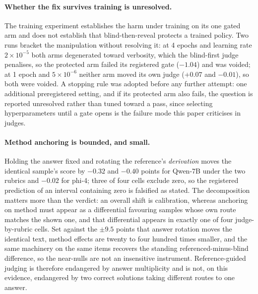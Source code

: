 \documentclass[11pt]{article}
\begin{document}
\paragraph{Whether the fix survives training is unresolved.}
The training experiment establishes the harm under training on its one gated arm and does not establish that blind-then-reveal protects a trained policy.
Two runs bracket the manipulation without resolving it: at 4 epochs and learning rate $2\times10^{-5}$ both arms degenerated toward verbosity, which the blind-first judge penalises, so the protected arm failed its registered gate ($-1.04$) and was voided; at 1 epoch and $5\times10^{-6}$ neither arm moved its own judge ($+0.07$ and $-0.01$), so both were voided.
A stopping rule was adopted before any further attempt: one additional preregistered setting, and if its protected arm also fails, the question is reported unresolved rather than tuned toward a pass, since selecting hyperparameters until a gate opens is the failure mode this paper criticises in judges.

\paragraph{Method anchoring is bounded, and small.}
Holding the answer fixed and rotating the reference's \emph{derivation} moves the identical sample's score by $-0.32$ and $-0.40$ points for Qwen-7B under the two rubrics and $-0.02$ for phi-4; three of four cells exclude zero, so the registered prediction of an interval containing zero is falsified as stated.
The decomposition matters more than the verdict: an overall shift is calibration, whereas anchoring on method must appear as a differential favouring samples whose own route matches the shown one, and that differential appears in exactly one of four judge-by-rubric cells.
Set against the $\pm 9.5$ points that answer rotation moves the identical text, method effects are twenty to four hundred times smaller, and the same machinery on the same items recovers the standing referenced-minus-blind difference, so the near-nulls are not an insensitive instrument.
Reference-guided judging is therefore endangered by answer multiplicity and is not, on this evidence, endangered by two correct solutions taking different routes to one answer.
\end{document}
